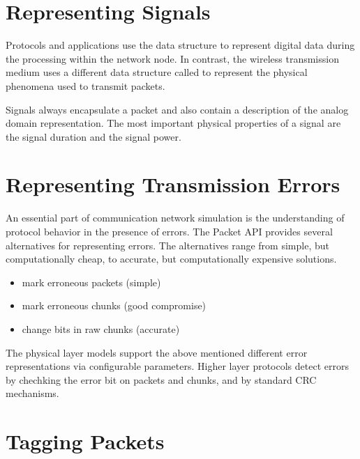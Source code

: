 
\section{Representing Signals}

Protocols and applications use the  data structure to represent
digital data during the processing within the network node. In contrast, the
wireless transmission medium uses a different data structure called
 to represent the physical phenomena used to transmit packets.


Signals always encapsulate a packet and also contain a description of the analog
domain representation. The most important physical properties of a signal are
the signal duration and the signal power.

\section{Representing Transmission Errors}

An essential part of communication network simulation is the understanding of
protocol behavior in the presence of errors. The Packet API provides several
alternatives for representing errors. The alternatives range from simple, but
computationally cheap, to accurate, but computationally expensive solutions.

\begin{itemize}
    \item mark erroneous packets (simple)
    \item mark erroneous chunks (good compromise)
    \item change bits in raw chunks (accurate)
\end{itemize}


The physical layer models support the above mentioned different error
representations via configurable parameters. Higher layer protocols detect
errors by chechking the error bit on packets and chunks, and by standard CRC
mechanisms.

\section{Tagging Packets}


